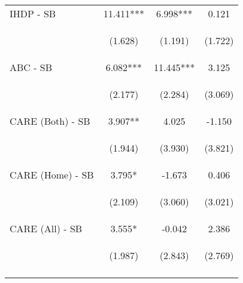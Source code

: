 \begin{tabular}{lccc}
\noalign{\smallskip}IHDP - SB & 11.411*** & 6.998*** & 0.121\\
 & \begin{footnotesize}(1.628)\end{footnotesize} & \begin{footnotesize}(1.191)\end{footnotesize} & \begin{footnotesize}(1.722)\end{footnotesize}\\
\noalign{\smallskip}ABC - SB & 6.082*** & 11.445*** & 3.125\\
 & \begin{footnotesize}(2.177)\end{footnotesize} & \begin{footnotesize}(2.284)\end{footnotesize} & \begin{footnotesize}(3.069)\end{footnotesize}\\
\noalign{\smallskip}CARE (Both) - SB & 3.907** & 4.025 & -1.150\\
 & \begin{footnotesize}(1.944)\end{footnotesize} & \begin{footnotesize}(3.930)\end{footnotesize} & \begin{footnotesize}(3.821)\end{footnotesize}\\
\noalign{\smallskip}CARE (Home) - SB & 3.795* & -1.673 & 0.406\\
 & \begin{footnotesize}(2.109)\end{footnotesize} & \begin{footnotesize}(3.060)\end{footnotesize} & \begin{footnotesize}(3.021)\end{footnotesize}\\
\noalign{\smallskip}CARE (All) - SB & 3.555* & -0.042 & 2.386\\
 & \begin{footnotesize}(1.987)\end{footnotesize} & \begin{footnotesize}(2.843)\end{footnotesize} & \begin{footnotesize}(2.769)\end{footnotesize}\\
\noalign{\smallskip}\hline\end{tabular}\\
